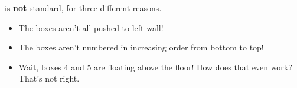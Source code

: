 is \textbf{not} standard, for three different reasons.
\begin{itemize}
\item The boxes aren't all pushed to left wall!
\item The boxes aren't numbered in increasing order from bottom to top!
\item Wait, boxes 4 and 5 are floating above the floor! How does that even work?
  That's not right.
\end{itemize}




